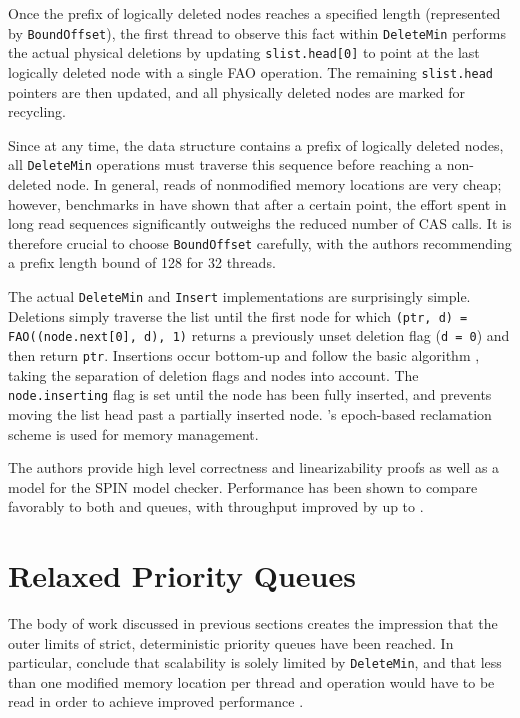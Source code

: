 \documentclass[a4paper,10pt]{article}
\begin{document}
Once the prefix of logically deleted nodes reaches a specified length (represented by \lstinline|BoundOffset|),
the first thread to observe this fact within \lstinline|DeleteMin| performs the actual physical
deletions by updating \lstinline|slist.head[0]| to point at the last logically deleted node with a
single \ac{FAO} operation. The remaining \lstinline|slist.head| pointers are then updated, and
all physically deleted nodes are marked for recycling.

Since at any time, the data structure contains a prefix of logically deleted nodes, all \lstinline|DeleteMin|
operations must traverse this sequence before reaching a non-deleted node. In general, reads of nonmodified
memory locations are very cheap; however, benchmarks in \cite{linden2013skiplist} have shown that
after a certain point, the effort spent in long read sequences significantly outweighs the reduced
number of \ac{CAS} calls. It is therefore crucial to choose \lstinline|BoundOffset| carefully, with the
authors recommending a prefix length bound of 128 for 32 threads.

The actual \lstinline|DeleteMin| and \lstinline|Insert| implementations are surprisingly simple.
Deletions simply traverse the list until the first node for which \lstinline|(ptr, d) = FAO((node.next[0], d), 1)|
returns a previously unset deletion flag (\lstinline|d = 0|) and then return \lstinline|ptr|.
Insertions occur bottom-up and follow the basic \citeauthor{fraser2004practical} algorithm \cite{fraser2004practical},
taking the separation of deletion flags and nodes into account. The \lstinline|node.inserting| flag
is set until the node has been fully inserted, and prevents moving the list head past a partially
inserted node. \citeauthor{fraser2004practical}'s epoch-based reclamation scheme \cite{fraser2004practical}
is used for memory management.

The authors provide high level correctness and linearizability proofs as well as a model for the
SPIN model checker. Performance has been shown to compare favorably to both
\citeauthor{sundell2003fast} and \citeauthor{shavit2000skiplist} queues, with throughput improved by
up to .

\section{Relaxed Priority Queues} \label{sec:relaxed}

The body of work discussed in previous sections
creates the impression that the outer limits of strict, deterministic priority queues have been reached.
In particular, \citeauthor{linden2013skiplist} conclude that scalability is solely limited by \lstinline|DeleteMin|,
and that less than one modified memory location per thread and operation would have to be read
in order to achieve improved performance \cite{linden2013skiplist}.
\end{document}
